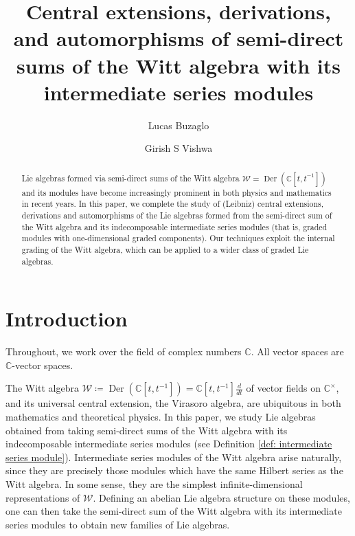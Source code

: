 \documentclass[11pt, svgnames]{amsart}
\title[Semi-direct sums of the Witt algebra with its intermediate series modules]{Central extensions, derivations, and automorphisms of semi-direct sums of the Witt algebra with its intermediate series modules}
\author{Lucas Buzaglo}
\author{Girish S Vishwa}
\date{}
\newcommand{\CC}{\mathbb{C}}
\newcommand{\W}{\mathcal{W}}
\DeclareMathOperator{\Der}{Der}
\newcommand{\diff}[1]{\frac{d}{d#1}}
\theoremstyle{definition}
\begin{document}
\begin{abstract}
    Lie algebras formed via semi-direct sums of the Witt algebra $\W = \Der(\CC[t,t^{-1}])$ and its modules have become increasingly prominent in both physics and mathematics in recent years. In this paper, we complete the study of (Leibniz) central extensions, derivations and automorphisms of the Lie algebras formed from the semi-direct sum of the Witt algebra and its indecomposable intermediate series modules (that is, graded modules with one-dimensional graded components). Our techniques exploit the internal grading of the Witt algebra, which can be applied to a wider class of graded Lie algebras.
\end{abstract}

\maketitle
\tableofcontents

\section{Introduction}\label{sec:intro}

Throughout, we work over the field of complex numbers $\CC$. All vector spaces are $\CC$-vector spaces.

The Witt algebra $\W \coloneqq \Der(\CC[t,t^{-1}]) = \CC[t,t^{-1}]\diff{t}$ of vector fields on $\CC^\times$, and its universal central extension, the Virasoro algebra, are ubiquitous in both mathematics and theoretical physics. In this paper, we study Lie algebras obtained from taking semi-direct sums of the Witt algebra with its indecomposable intermediate series modules (see Definition \ref{def: intermediate series module}). Intermediate series modules of the Witt algebra arise naturally, since they are precisely those modules which have the same Hilbert series as the Witt algebra. In some sense, they are the simplest infinite-dimensional representations of $\W$. Defining an abelian Lie algebra structure on these modules, one can then take the semi-direct sum of the Witt algebra with its intermediate series modules to obtain new families of Lie algebras.
\end{document}
